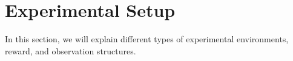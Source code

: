 

\chapter{Experimental Setup}\label{chapter:experimental_setup}


In this section, we will explain different types of experimental environments, reward, and observation structures.  














